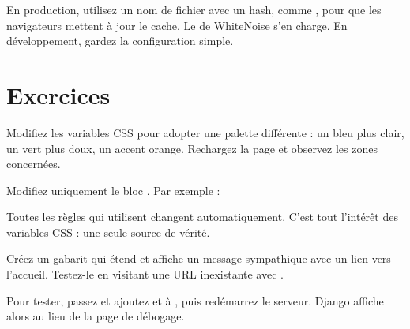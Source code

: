 \begin{bonne}
En production, utilisez un nom de fichier avec un hash, comme
, pour que les navigateurs mettent à jour le cache. Le
 de WhiteNoise s'en charge. En
développement, gardez la configuration simple.
\end{bonne}

\section{Exercices}

\begin{exercice}
Modifiez les variables CSS pour adopter une palette différente : un bleu plus
clair, un vert plus doux, un accent orange. Rechargez la page et observez les
zones concernées.
\end{exercice}

\begin{correction}
Modifiez uniquement le bloc . Par exemple :


Toutes les règles qui utilisent  changent automatiquement. C'est
tout l'intérêt des variables CSS : une seule source de vérité.
\end{correction}

\begin{exercice}
Créez un gabarit  qui étend  et affiche un
message sympathique avec un lien vers l'accueil. Testez-le en visitant une URL
inexistante avec .
\end{exercice}

\begin{correction}

Pour tester, passez  et ajoutez  et
 à , puis redémarrez le serveur. Django
affiche alors  au lieu de la page de débogage.
\end{correction}


